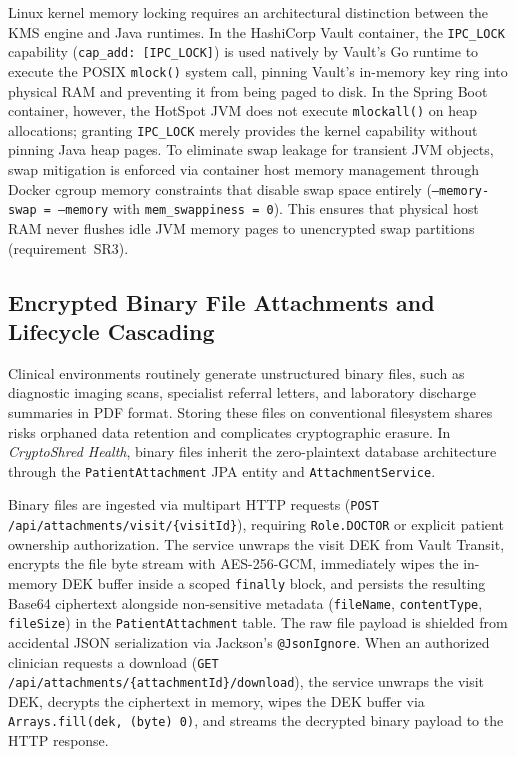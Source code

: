 Linux kernel memory locking requires an architectural distinction between the KMS engine and Java runtimes. In the HashiCorp Vault container, the \texttt{IPC\_LOCK} capability (\texttt{cap\_add: [IPC\_LOCK]}) is used natively by Vault's Go runtime to execute the POSIX \texttt{mlock()} system call, pinning Vault's in-memory key ring into physical RAM and preventing it from being paged to disk. In the Spring Boot container, however, the HotSpot JVM does not execute \texttt{mlockall()} on heap allocations; granting \texttt{IPC\_LOCK} merely provides the kernel capability without pinning Java heap pages. To eliminate swap leakage for transient JVM objects, swap mitigation is enforced via container host memory management through Docker cgroup memory constraints that disable swap space entirely (\texttt{--memory-swap = --memory} with \texttt{mem\_swappiness = 0}). This ensures that physical host RAM never flushes idle JVM memory pages to unencrypted swap partitions (requirement~SR3).

\subsection{Encrypted Binary File Attachments and Lifecycle Cascading}

Clinical environments routinely generate unstructured binary files, such as diagnostic imaging scans, specialist referral letters, and laboratory discharge summaries in PDF format. Storing these files on conventional filesystem shares risks orphaned data retention and complicates cryptographic erasure. In \textit{CryptoShred Health}, binary files inherit the zero-plaintext database architecture through the \texttt{PatientAttachment} JPA entity and \texttt{AttachmentService}.

Binary files are ingested via multipart HTTP requests (\texttt{POST /api/attachments/visit/\{visitId\}}), requiring \texttt{Role.DOCTOR} or explicit patient ownership authorization. The service unwraps the visit DEK from Vault Transit, encrypts the file byte stream with AES-256-GCM, immediately wipes the in-memory DEK buffer inside a scoped \texttt{finally} block, and persists the resulting Base64 ciphertext alongside non-sensitive metadata (\texttt{fileName}, \texttt{contentType}, \texttt{fileSize}) in the \texttt{PatientAttachment} table. The raw file payload is shielded from accidental JSON serialization via Jackson's \texttt{@JsonIgnore}. When an authorized clinician requests a download (\texttt{GET /api/attachments/\{attachmentId\}/download}), the service unwraps the visit DEK, decrypts the ciphertext in memory, wipes the DEK buffer via \texttt{Arrays.fill(dek, (byte) 0)}, and streams the decrypted binary payload to the HTTP response.

